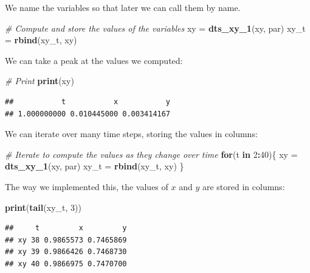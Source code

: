 \documentclass[
]{book}
\newenvironment{Shaded}{\begin{snugshade}}{\end{snugshade}}
\newcommand{\CommentTok}[1]{\textcolor[rgb]{0.56,0.35,0.01}{\textit{#1}}}
\newcommand{\ControlFlowTok}[1]{\textcolor[rgb]{0.13,0.29,0.53}{\textbf{#1}}}
\newcommand{\DecValTok}[1]{\textcolor[rgb]{0.00,0.00,0.81}{#1}}
\newcommand{\FunctionTok}[1]{\textcolor[rgb]{0.13,0.29,0.53}{\textbf{#1}}}
\newcommand{\NormalTok}[1]{#1}
\newcommand{\OtherTok}[1]{\textcolor[rgb]{0.56,0.35,0.01}{#1}}
\newcommand{\SpecialCharTok}[1]{\textcolor[rgb]{0.81,0.36,0.00}{\textbf{#1}}}
\begin{document}
We name the variables so that later we can call them by name.

\begin{Shaded}
\begin{Highlighting}[]
\CommentTok{\# Compute and store the values of the variables  }
\NormalTok{xy }\OtherTok{=} \FunctionTok{dts\_xy\_1}\NormalTok{(xy, par)}
\NormalTok{xy\_t }\OtherTok{=} \FunctionTok{rbind}\NormalTok{(xy\_t, xy)}
\end{Highlighting}
\end{Shaded}

We can take a peak at the values we computed:

\begin{Shaded}
\begin{Highlighting}[]
\CommentTok{\# Print }
\FunctionTok{print}\NormalTok{(xy) }
\end{Highlighting}
\end{Shaded}

\begin{verbatim}
##           t           x           y 
## 1.000000000 0.010445000 0.003414167
\end{verbatim}

We can iterate over many time steps, storing the values in columns:

\begin{Shaded}
\begin{Highlighting}[]
\CommentTok{\# Iterate to compute the values as they change over time }
\ControlFlowTok{for}\NormalTok{(t }\ControlFlowTok{in} \DecValTok{2}\SpecialCharTok{:}\DecValTok{40}\NormalTok{)\{}
\NormalTok{  xy }\OtherTok{=} \FunctionTok{dts\_xy\_1}\NormalTok{(xy, par) }
\NormalTok{  xy\_t }\OtherTok{=} \FunctionTok{rbind}\NormalTok{(xy\_t, xy) }
\NormalTok{\} }
\end{Highlighting}
\end{Shaded}

The way we implemented this, the values of \(x\) and \(y\) are stored in columns:

\begin{Shaded}
\begin{Highlighting}[]
\FunctionTok{print}\NormalTok{(}\FunctionTok{tail}\NormalTok{(xy\_t, }\DecValTok{3}\NormalTok{)) }
\end{Highlighting}
\end{Shaded}

\begin{verbatim}
##     t         x         y
## xy 38 0.9865573 0.7465869
## xy 39 0.9866426 0.7468730
## xy 40 0.9866975 0.7470700
\end{verbatim}
\end{document}

